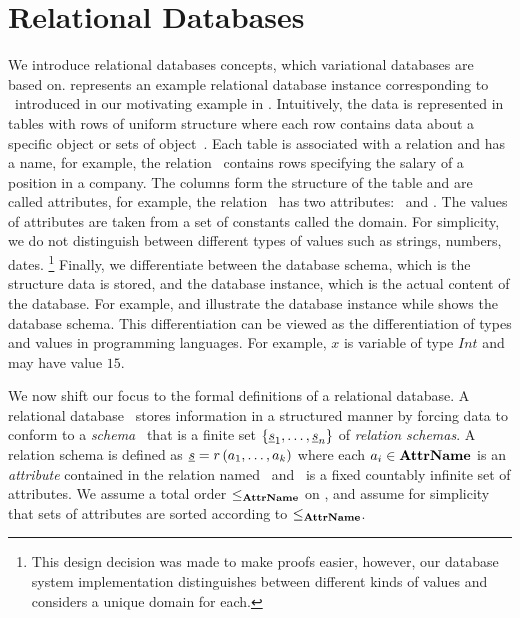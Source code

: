 \section{Relational Databases}
\label{sec:rdb}

We introduce relational databases concepts, which variational databases are based on. 
 represents an example relational
database instance corresponding to \vTwo\ introduced in our motivating
example in . 
%
Intuitively, the data is represented in tables with rows of uniform structure
where each row contains  data about a specific
object or sets of object~\cite{AliceBook}. Each table is 
associated with a relation and has a name, for example, 
the relation \job\ contains rows specifying the salary of a position in a company. 
The columns form the structure of the table and are called attributes,
for example, the relation \job\ has two attributes: \titleatt\ and \salary. 
The values of attributes are taken from a set of constants called the domain. 
For simplicity, 
we do not distinguish between different types of values such as strings, numbers,
dates.%
\footnote{This design decision was made to make proofs easier, however, our
database system implementation distinguishes between different kinds of values
and considers a unique domain for each.}
%
Finally, we differentiate between the database schema, which is the structure 
data is stored, and the database instance, which is the actual content of the 
database. 
%
For example,  and  illustrate the database 
instance while  shows the database schema. 
%
This differentiation can be viewed as the differentiation of types and
values in programming languages. For example, $x$ is variable of type $\mathit{Int}$
and may have value $15$. 






We now shift our focus to the formal definitions of a relational database. 
A relational database \pDB\ stores information in a structured manner by forcing
data to conform to a \emph{schema} \pSch\ that is a finite set 
$\setDef {{\pRelSch}_1, \ldots, {\pRelSch}_n}$ of \emph{relation schemas}.
A relation schema is defined as
$\pRelSch = \vRel \paran {\vi \pAtt k}$ where each $\pAtt_i \in \pAttSet$ is an
\emph{attribute} contained in the relation named \vRel\ and \pAttSet\ is a 
fixed countably infinite set of 
attributes. %
%
We assume a total order $\leq_{\pAttSet}$ on \pAttSet, and assume for
simplicity that sets of attributes are sorted according
to $\leq_{\pAttSet}$.
%

